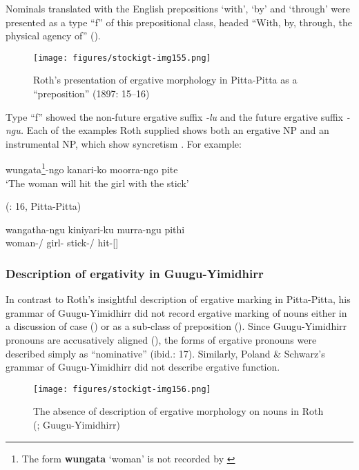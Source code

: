 Nominals translated with the English prepositions `with’, `by' and `through' were presented as a type “f” of this prepositional class, headed “With, by, through, the physical agency of” ().


\begin{figure}
\texttt{[image: figures/stockigt-img155.png]}
\caption{Roth’s presentation of ergative morphology in Pitta-Pitta as a “preposition'' (1897: 15--16)}
\label{bkm:Ref338507335}
\label{fig:key:10-155}
\end{figure}

Type “f” showed the non-future ergative suffix \textit{-lu} and the future ergative suffix \textit{-ngu.} Each of the examples Roth supplied shows both an ergative NP and an instrumental NP, which show syncretism \citep[193]{blake_pitta_1979}. For example:

\ea
wungata\label{ex:key:10:6:roth}\footnote{The form \textbf{wungata} `woman' is not recorded by \citet{blake_pitta_1979}}{}-ngo    kanari-ko      moorra-ngo           pite\\
\glt `The woman will hit the girl with the stick'

(\citealt{roth_ethnological_1897}: 16, Pitta-Pitta)

\gll wangatha-ngu                  kiniyari-ku    murra-ngu             pithi\\
woman-/      girl-       stick-/   hit-[]\\
\z

\subsubsection{Description of ergativity in Guugu-Yimidhirr}
\label{sec:key:10.1.5.2}

In contrast to Roth’s insightful description of ergative marking in Pitta-Pitta, his grammar of Guugu-Yimidhirr \citeyearpar{roth_structure_1901} did not record ergative marking of nouns either in a discussion of case () or as a sub-class of preposition (). Since Guugu-Yimidhirr pronouns are accusatively aligned (), the forms of ergative pronouns were described simply as “nominative” (ibid.: 17). Similarly, Poland \& Schwarz’s grammar of Guugu-Yimidhirr \citeyearpar{schwarz_koko_1900} did not describe ergative function.

\begin{figure}
\texttt{[image: figures/stockigt-img156.png]}
\caption{The absence of description of ergative morphology on nouns in Roth (\citeyear[16]{roth_structure_1901}; Guugu-Yimidhirr)}
\label{bkm:Ref465081955}\label{fig:key:10-156}
\end{figure}

